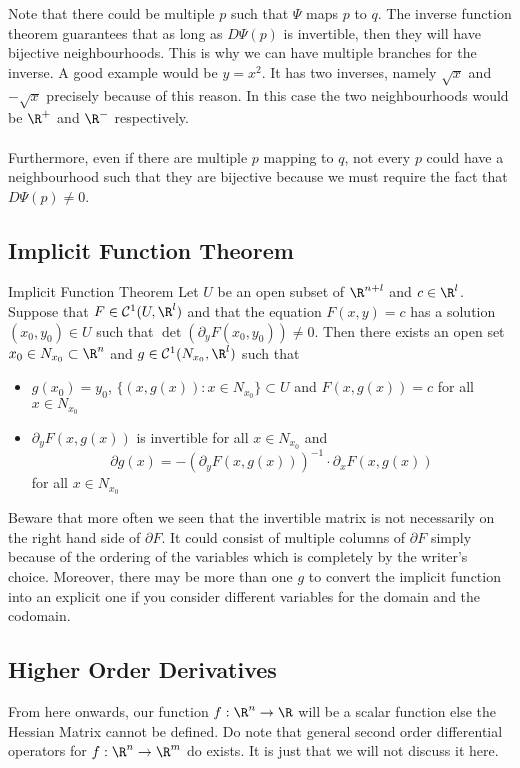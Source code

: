 \documentclass[a4paper]{article}
\begin{document}
Note that there could be multiple $p$ such that $\Psi$ maps $p$ to $q$. The inverse function theorem guarantees that as long as $D\Psi(p)$ is invertible, then they will have bijective neighbourhoods. This is why we can have multiple branches for the inverse. A good example would be $y=x^2$. It has two inverses, namely $\sqrt{x}$ and $-\sqrt{x}$ precisely because of this reason. In this case the two neighbourhoods would be $\R^+$ and $\R^-$ respectively. \\~\\

Furthermore, even if there are multiple $p$ mapping to $q$, not every $p$ could have a neighbourhood such that they are bijective because we must require the fact that $D\Psi(p)\neq 0$. 

\subsection{Implicit Function Theorem}
\begin{thm}{Implicit Function Theorem}{} Let $U$ be an open subset of $\R^{n+l}$ and $c\in\R^l$. Suppose that $F\in\mathcal{C}^1(U,\R^l)$ and that the equation $F(x,y)=c$ has a solution $(x_0,y_0)\in U$ such that $\det(\partial_yF(x_0,y_0))\neq 0$. Then there exists an open set $x_0\in N_{x_0}\subset\R^n$ and $g\in\mathcal{C}^1(N_{x_0},\R^l)$ such that 
\begin{itemize}
\item $g(x_0)=y_0$, $\{(x,g(x)):x\in N_{x_0}\}\subset U$ and $F(x,g(x))=c$ for all $x\in N_{x_0}$
\item $\partial_yF(x,g(x))$ is invertible for all $x\in N_{x_0}$ and $$\partial g(x)=-(\partial_yF(x,g(x)))^{-1}\cdot\partial_xF(x,g(x))$$ for all $x\in N_{x_0}$
\end{itemize}
\end{thm}

Beware that more often we seen that the invertible matrix is not necessarily on the right hand side of $\partial F$. It could consist of multiple columns of $\partial F$ simply because of the ordering of the variables which is completely by the writer's choice. Moreover, there may be more than one $g$ to convert the implicit function into an explicit one if you consider different variables for the domain and the codomain. 

\subsection{Higher Order Derivatives}
From here onwards, our function $f:\R^n\to\R$ will be a scalar function else the Hessian Matrix cannot be defined. Do note that general second order differential operators for $f:\R^n\to\R^m$ do exists. It is just that we will not discuss it here. 
\end{document}

